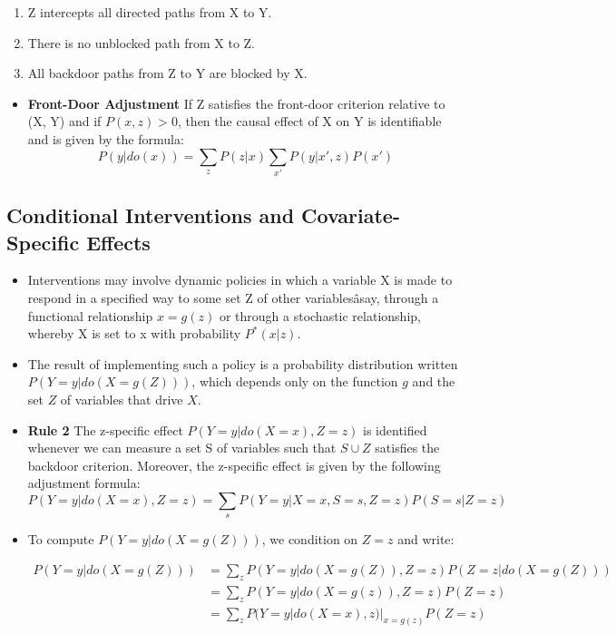 \documentclass[]{article}
\providecommand{\tightlist}{%
  \setlength{\itemsep}{0pt}\setlength{\parskip}{0pt}}
\begin{document}
\begin{enumerate}
\def\labelenumi{\arabic{enumi}.}
\tightlist
\item
  Z intercepts all directed paths from X to Y.
\item
  There is no unblocked path from X to Z.
\item
  All backdoor paths from Z to Y are blocked by X.
\end{enumerate}

\begin{itemize}
\tightlist
\item
  \textbf{Front-Door Adjustment} If Z satisfies the front-door criterion
  relative to (X, Y) and if \(P(x, z) > 0\), then the causal effect of X
  on Y is identifiable and is given by the formula: \[
  P(y|do(x)) = \sum_z P(z|x) \sum_{x'} P(y|x', z)P(x')
  \]
\end{itemize}

\subsection{Conditional Interventions and Covariate-Specific
Effects}\label{conditional-interventions-and-covariate-specific-effects}

\begin{itemize}
\item
  Interventions may involve dynamic policies in which a variable X is
  made to respond in a specified way to some set Z of other
  variablesâsay, through a functional relationship \(x = g(z)\) or
  through a stochastic relationship, whereby X is set to x with
  probability \(P^*(x|z)\).
\item
  The result of implementing such a policy is a probability distribution
  written \(P(Y = y|do(X = g(Z)))\), which depends only on the function
  \(g\) and the set \(Z\) of variables that drive \(X\).
\item
  \textbf{Rule 2} The z-specific effect \(P(Y = y|do(X = x), Z = z)\) is
  identified whenever we can measure a set S of variables such that
  \(S \cup Z\) satisfies the backdoor criterion. Moreover, the
  z-specific effect is given by the following adjustment formula: \[
  P(Y = y|do(X = x), Z = z) = \sum_s P(Y = y|X = x, S = s, Z = z)P(S = s|Z = z)
  \]
\item
  To compute \(P(Y = y|do(X = g(Z)))\), we condition on \(Z = z\) and
  write:

  \begin{equation*}
  \begin{split}
  P(Y = y|do(X = g(Z))) &= \sum_z P(Y = y|do(X = g(Z)), Z = z)P(Z = z|do(X = g(Z)))\\
                    &= \sum_z P(Y = y|do(X = g(z)), Z = z)P(Z = z)\\
                    &= \sum_z P(Y = y|do(X = x),z)|_{x=g(z)}P(Z = z)
  \end{split}
  \end{equation*}
\end{itemize}
\end{document}
